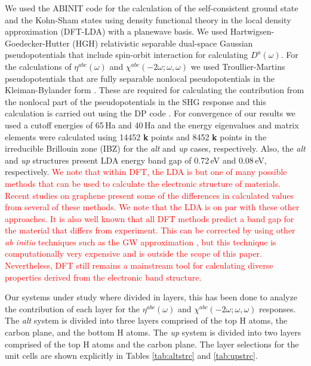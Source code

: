 \documentclass[pss]{wiley2sp} %
\begin{document}
We used the ABINIT code \cite{gonzeCPC09} for the calculation of the 
self-consistent ground state and the Kohn-Sham states using density functional
theory in the local density approximation (DFT-LDA) with a planewave basis. We
used Hartwigsen-Goedecker-Hutter (HGH) relativistic separable dual-space
Gaussian pseudopotentials \cite{hartwigsenPRB98} that include spin-orbit
interaction for calculating $D^{a}(\omega)$. For the calculations of
{$\eta^{abc}(\omega)$} and $\chi^{abc}(-2\omega;\omega,\omega)$ we used
Troullier-Martins pseudopotentials \cite{troullierPRB91} that are fully
separable nonlocal pseudopotentials in the Kleiman-Bylander form
\cite{kleinmanPRL82}. These are required for calculating the contribution from
the nonlocal part of the pseudopotentials in the SHG response and this
calculation is carried out using the DP code \cite{olevanoDP}. For convergence
of our results we used a cutoff energies of 65\,Ha and 40\,Ha and the energy
eigenvalues and matrix elements were calculated using 14452 \textbf{k} points
and 8452 \textbf{k} points in the irreducible Brillouin zone (IBZ) for the
\emph{alt} and \emph{up} cases, respectively. Also, the \emph{alt} and
\emph{up} structures present LDA energy band gap of  0.72\,eV and 0.08\,eV,
respectively.
\textcolor{red}{
We note that within DFT, the LDA is but one of many possible methods that can
be used to calculate the electronic structure of materials. Recent
studies on graphene \cite{karamanisJPCC15,botelloACR14} present some of the
differences in calculated values from several of these methods. We note that the LDA is on par with these other approaches. It is also
well known that all DFT methods predict a band gap for the material that
differs from experiment. This can be corrected by using other
\emph{ab initio} techniques such as the GW approximation \cite{onidaRMP02}, but this technique is computationally very expensive and is outside the
scope of this paper. Nevertheless, DFT still remains a mainstream tool for calculating diverse properties derived from the electronic band structure.
} 

Our systems under study where divided in layers, this has been done to analyze
the contribution of each layer for the $\eta^{abc}(\omega)$ and
$\chi^{abc}(-2\omega;\omega,\omega)$ responses. The
\emph{alt} system is divided into three layers comprised of the top H atoms,
the carbon plane, and the bottom H atoms. The \emph{up} system is divided into
two layers comprised of the top H atoms and the carbon plane. The layer
selections for the unit cells are shown explicitly in Tables \ref{tab:altstrc}
and \ref{tab:upstrc}.
\end{document}
